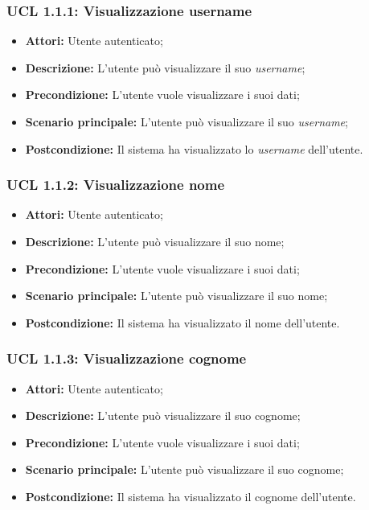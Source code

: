 \hypertarget{L1.1.1}{}
\subsubsection{UCL 1.1.1: Visualizzazione username}
\begin{itemize}
	\item \textbf{Attori:} Utente autenticato;
	\item \textbf{Descrizione:} L'utente può visualizzare il suo \textit{username};
	\item \textbf{Precondizione:} L'utente vuole visualizzare i suoi dati;
	\item \textbf{Scenario principale:} L'utente può visualizzare il suo \textit{username};
\item \textbf{Postcondizione:} Il sistema ha visualizzato lo \textit{username} dell'utente.
\end{itemize}

\hypertarget{L1.1.2}{}
\subsubsection{UCL 1.1.2: Visualizzazione nome}
\begin{itemize}
	\item \textbf{Attori:} Utente autenticato;
	\item \textbf{Descrizione:} L'utente può visualizzare il suo nome;
	\item \textbf{Precondizione:} L'utente vuole visualizzare i suoi dati;\\
	\item \textbf{Scenario principale:} L'utente può visualizzare il suo nome;
	\item \textbf{Postcondizione:} Il sistema ha visualizzato il nome dell'utente.
\end{itemize}

\hypertarget{L1.1.3}{}
\subsubsection{UCL 1.1.3: Visualizzazione cognome}
\begin{itemize}
	\item \textbf{Attori:} Utente autenticato;
	\item \textbf{Descrizione:} L'utente può visualizzare il suo cognome;
	\item \textbf{Precondizione:} L'utente vuole visualizzare i suoi dati;
	\item \textbf{Scenario principale:} L'utente può visualizzare il suo cognome;
	\item \textbf{Postcondizione:} Il sistema ha visualizzato il cognome dell'utente.
\end{itemize}

